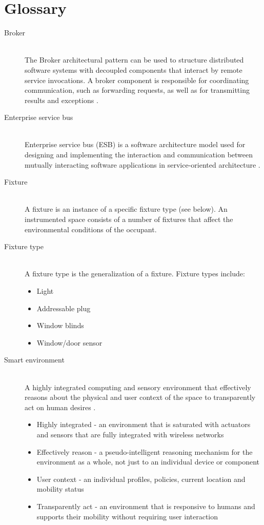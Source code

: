 \chapter{Glossary}
\begin{description}


\item[Broker] \hfill \\
 The Broker architectural pattern can be used to structure distributed software systems with decoupled components that interact by remote service invocations. A broker component is responsible for coordinating communication, such as forwarding requests, as well as for transmitting results and exceptions \cite{Buschmann}.
 

 
 \item[Enterprise service bus ] \hfill \\
   Enterprise service bus (ESB) is a software architecture model used for designing and implementing the interaction and communication between mutually interacting software applications in service-oriented architecture \cite{ESBBook}.
    
 
  \item[Fixture] \hfill \\
   A fixture is an instance of a specific fixture type (see below). An instrumented space consists of a number of fixtures that affect the environmental conditions of the occupant.

  \item[Fixture type] \hfill \\
  A fixture type is the generalization of a fixture. Fixture types include:
  \begin{itemize}
  	\item Light
  	\item Addressable plug
  	\item Window blinds
  	\item Window/door sensor
  \end{itemize}

 \item[Smart environment] \hfill \\
A highly integrated computing and sensory environment that effectively reasons about the physical and user context of the space to transparently act on human desires \cite{Lupiana09}.
\begin{itemize}
\item Highly integrated - an environment that is saturated with actuators and sensors that are fully integrated with wireless networks
\item Effectively reason - a pseudo-intelligent reasoning mechanism for the environment as a whole, not just to an individual device or component 
\item User context - an individual profiles, policies, current location and mobility status
\item Transparently act - an environment that is responsive to humans and supports their mobility without requiring user interaction
\end{itemize}


\end{description}
